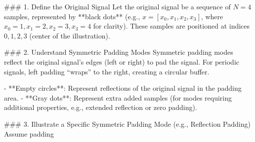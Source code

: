 ### 1. Define the Original Signal  
Let the original signal be a sequence of \( N = 4 \) samples, represented by **black dots** (e.g., \( x = [x_0, x_1, x_2, x_3] \), where \( x_0 = 1, x_1 = 2, x_2 = 3, x_3 = 4 \) for clarity). These samples are positioned at indices \( 0, 1, 2, 3 \) (center of the illustration).  


### 2. Understand Symmetric Padding Modes  
Symmetric padding modes reflect the original signal’s edges (left or right) to pad the signal. For periodic signals, left padding “wraps” to the right, creating a circular buffer.  

- **Empty circles**: Represent reflections of the original signal in the padding area.  
- **Gray dots**: Represent extra added samples (for modes requiring additional properties, e.g., extended reflection or zero padding).  


### 3. Illustrate a Specific Symmetric Padding Mode (e.g., Reflection Padding)  
Assume padding